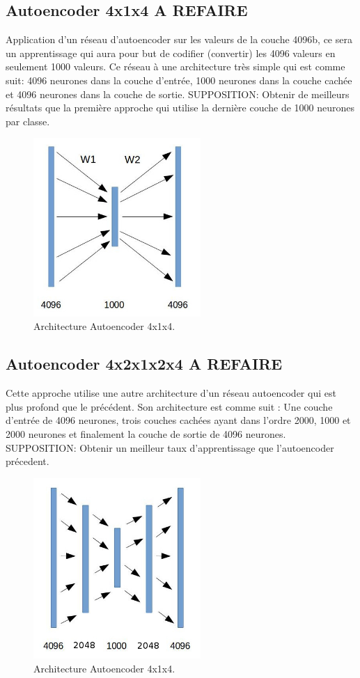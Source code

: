 \subsection{Autoencoder 4x1x4 A REFAIRE} Application d'un réseau d'autoencoder sur les valeurs de la couche 4096b, ce sera un apprentissage qui aura pour but de codifier (convertir) les 4096 valeurs en seulement 1000 valeurs. Ce réseau à une architecture très simple qui est comme suit: 4096 neurones dans la couche d'entrée, 1000 neurones dans la couche cachée et 4096 neurones dans la couche de sortie.
SUPPOSITION: Obtenir de meilleurs résultats que la première approche qui utilise la dernière couche de 1000 neurones par classe.

\begin{figure}[H]
	\centering
		\includegraphics[width=2.5in]{Figures/ae/414.jpg}
	\caption[An Electron]{Architecture Autoencoder 4x1x4.}
	\label{fig:Electron}
\end{figure}

\subsection{Autoencoder 4x2x1x2x4 A REFAIRE} Cette approche utilise une autre architecture d'un réseau autoencoder qui est plus profond que le précédent. Son architecture est comme suit : Une couche d'entrée de 4096 neurones, trois couches cachées ayant dans l'ordre 2000, 1000 et 2000 neurones et finalement la couche de sortie de 4096 neurones.
SUPPOSITION: Obtenir un meilleur taux d'apprentissage que l'autoencoder précedent.

\begin{figure}[H]
	\centering
		\includegraphics[width=2.5in]{Figures/ae/42124.jpg}
	\caption[An Electron]{Architecture Autoencoder 4x1x4.}
	\label{fig:Electron}
\end{figure}


